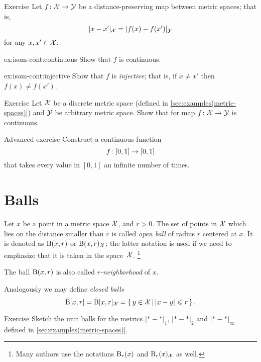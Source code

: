 \begin{thm}{Exercise}\label{ex:isom-cont}
Let $f\colon\mathcal{X}\to\mathcal{Y}$ be a distance-preserving map between metric spaces;
that is,
\[|x-x'|_{\mathcal X}=
|f(x)-f(x')|_{\mathcal Y}\]
for any $x,x'\in \mathcal{X}$.

\begin{subthm}{ex:isom-cont:continuous}
Show that $f$ is continuous.
\end{subthm}

\begin{subthm}{ex:isom-cont:injective}
Show that $f$ is \emph{injective}; that is, if $x\ne x'$ then $f(x)\ne f(x')$.
\end{subthm}

\end{thm}

\begin{thm}{Exercise}\label{ex:to-descrete}
Let $\mathcal{X}$ be a discrete metric space (defined in \ref{sec:examples(metric-spaces)})
and $\mathcal{Y}$ be arbitrary metric space.
Show that for map $f\colon\mathcal{X}\to\mathcal{Y}$ is continuous.
\end{thm}



\begin{thm}{Advanced exercise}\label{ex:infinite-inverse-image}
Construct a continuous function 
\[f\:[0,1]\z\to [0,1]\] that takes every value in $[0,1]$ 
an infinite number of times.
\end{thm}


\section{Balls}

Let $x$ be a point in a metric space $\mathcal{X}$,
and $r>0$.
The set of points in $\mathcal{X}$ which lies on the distance smaller than $r$ is called \emph{open ball} of radius $r$ centered at $x$.
It is denoted as $\mathrm{B}(x,r)$ 
or $\mathrm{B}(x,r)_{\mathcal{X}}$;
the latter notation is used if we need to emphasize that it is taken in the space~$\mathcal{X}$.%
\footnote{Many authors use the notations $\mathrm{B}_r(x)$ and $\mathrm{B}_r(x)_{\mathcal{X}}$ as well.}

The ball $\mathrm{B}(x,r)$ is also called \emph{$r$-neighborhood} of $x$.

Analogously we may define {}\emph{closed balls} 
\[\bar{\mathrm{B}}[x,r]=\bar{\mathrm{B}}[x,r]_{\mathcal{X}}=\left\{\,{y\in \mathcal{X}}\,\middle|\,{|x-y|\leqslant r}\,\right\}.\] 

\begin{thm}{Exercise}\label{ex:d1+d2+dinfty-balls}
Sketch the unit balls for the metrics $|{*}-{*}|_1$, $|{*}-{*}|_2$ and $|{*}-{*}|_\infty$ defined in \ref{sec:examples(metric-spaces)}.
\end{thm}

